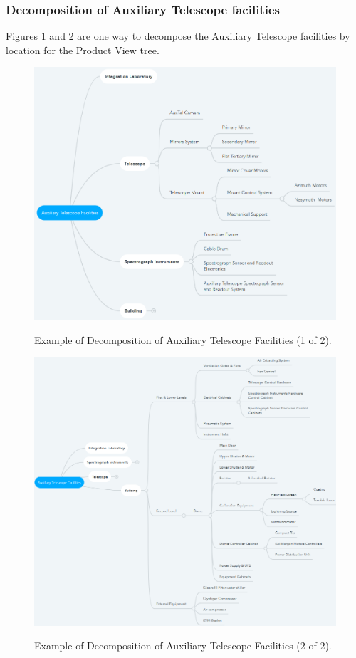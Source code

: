 \subsubsection{Decomposition of Auxiliary Telescope facilities}

Figures \ref{fig:auxtel-facilities-example-1of2} and \ref{fig:auxtel-facilities-example-2of2} are one way to decompose the Auxiliary Telescope facilities by location for the Product View tree.

\begin{figure}[t]
\caption{Example of Decomposition of Auxiliary Telescope Facilities (1 of 2).}
\centering
\includegraphics[width=\textwidth]{auxtel-facilities-example-1of2}
\label{fig:auxtel-facilities-example-1of2}
\end{figure}

\begin{figure}[t]
\caption{Example of Decomposition of Auxiliary Telescope Facilities (2 of 2).}
\centering
\includegraphics[width=\textwidth]{auxtel-facilities-example-2of2}
\label{fig:auxtel-facilities-example-2of2}
\end{figure}
